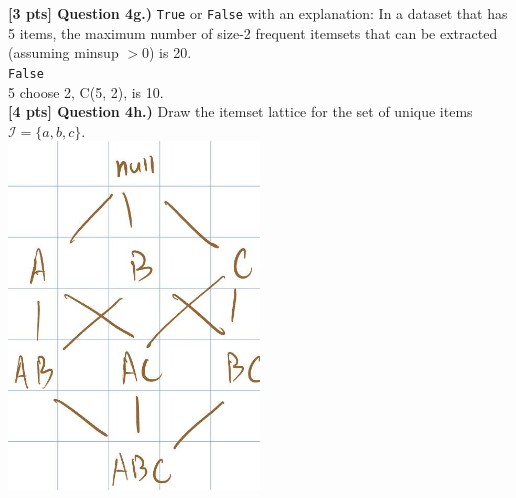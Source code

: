 \documentclass[paper=a4, fontsize=11pt]{scrartcl} %
\begin{document}
\textbf{[3 pts] Question 4g.)} \verb"True" or \verb"False" with an explanation: In a dataset that has 5 items, the maximum number of size-2 frequent itemsets that can be extracted (assuming minsup $> 0$) is 20. \\

\verb"False" \\
5 choose 2, C(5, 2), is 10. \\

\textbf{[4 pts] Question 4h.)} Draw the itemset lattice for the set of unique items $\mathcal{I} = \{ a, b, c \}$. \\

\includegraphics[width=0.5\textwidth]{include/latatice.jpg}
\end{document}
